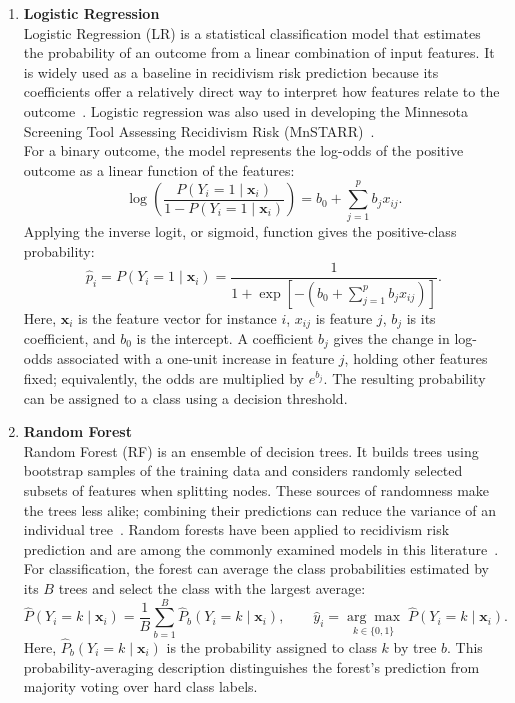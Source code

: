 \documentclass[12pt]{article}
\begin{document}
\begin{enumerate}
 \item \textbf{Logistic Regression} \\
  \tabto{2em} Logistic Regression (LR) is a statistical classification model that estimates the probability of an outcome from a linear combination of input features. It is widely used as a baseline in recidivism risk prediction because its coefficients offer a relatively direct way to interpret how features relate to the outcome~\cite{travaini2022machine}. Logistic regression was also used in developing the Minnesota Screening Tool Assessing Recidivism Risk (MnSTARR)~\cite{duwe2014development}.\\

  For a binary outcome, the model represents the log-odds of the positive outcome as a linear function of the features:
  \[
  \log\!\left(\frac{P(Y_i=1\mid\mathbf{x}_i)}{1-P(Y_i=1\mid\mathbf{x}_i)}\right)
  = b_0+\sum_{j=1}^{p}b_jx_{ij}.
  \]
  Applying the inverse logit, or sigmoid, function gives the positive-class probability:
  \[
  \hat{p}_i=P(Y_i=1\mid\mathbf{x}_i)
  =\frac{1}{1+\exp\!\left[-\left(b_0+\sum_{j=1}^{p}b_jx_{ij}\right)\right]}.
  \]
  Here, $\mathbf{x}_i$ is the feature vector for instance $i$, $x_{ij}$ is feature $j$, $b_j$ is its coefficient, and $b_0$ is the intercept. A coefficient $b_j$ gives the change in log-odds associated with a one-unit increase in feature $j$, holding other features fixed; equivalently, the odds are multiplied by $e^{b_j}$. The resulting probability can be assigned to a class using a decision threshold.\\

 \item \textbf{Random Forest}\\
  \tabto{2em} Random Forest (RF) is an ensemble of decision trees. It builds trees using bootstrap samples of the training data and considers randomly selected subsets of features when splitting nodes. These sources of randomness make the trees less alike; combining their predictions can reduce the variance of an individual tree~\cite{kovalchuk2023prediction}. Random forests have been applied to recidivism risk prediction and are among the commonly examined models in this literature~\cite{travaini2022machine}.\\

  For classification, the forest can average the class probabilities estimated by its $B$ trees and select the class with the largest average:
  \[
  \hat{P}(Y_i=k\mid\mathbf{x}_i)=\frac{1}{B}\sum_{b=1}^{B}\hat{P}_b(Y_i=k\mid\mathbf{x}_i),
  \qquad
  \hat{y}_i=\underset{k\in\{0,1\}}{\arg\max}\;\hat{P}(Y_i=k\mid\mathbf{x}_i).
  \]
  Here, $\hat{P}_b(Y_i=k\mid\mathbf{x}_i)$ is the probability assigned to class $k$ by tree $b$. This probability-averaging description distinguishes the forest's prediction from majority voting over hard class labels.\\


\end{enumerate}
\end{document}
